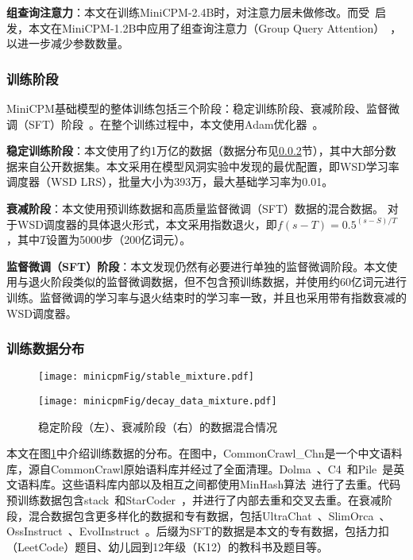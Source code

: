 \noindent\textbf{组查询注意力}：本文在训练MiniCPM-2.4B时，对注意力层未做修改。而受~\cite{liu2024mobilellm}启发，本文在MiniCPM-1.2B中应用了组查询注意力（Group Query Attention）~\citep{ainslie-etal-2023-gqa}，以进一步减少参数数量。

\subsubsection{训练阶段}
MiniCPM基础模型的整体训练包括三个阶段：稳定训练阶段、衰减阶段、监督微调（SFT）阶段~\citep{zhang2023instruction,wei2021finetuned}。在整个训练过程中，本文使用Adam优化器~\citep{kingma2014adam}。 

\textbf{稳定训练阶段}：本文使用了约1万亿的数据（数据分布见\ref{sec:appdatadistrbution}节），其中大部分数据来自公开数据集。本文采用在模型风洞实验中发现的最优配置，即WSD学习率调度器（WSD LRS），批量大小为393万，最大基础学习率为0.01。

\textbf{衰减阶段}：本文使用预训练数据和高质量监督微调（SFT）数据的混合数据。
对于WSD调度器的具体退火形式，本文采用指数退火，即$f(s-T)=  0.5^{(s-S)/T}$，其中$T$设置为5000步（200亿词元）。

\textbf{监督微调（SFT）阶段}：本文发现仍然有必要进行单独的监督微调阶段。本文使用与退火阶段类似的监督微调数据，但不包含预训练数据，并使用约60亿词元进行训练。监督微调的学习率与退火结束时的学习率一致，并且也采用带有指数衰减的WSD调度器。 


\subsubsection{训练数据分布}
\label{sec:appdatadistrbution}

\begin{figure}[htbp]
    \centering
    \begin{minipage}{0.48\linewidth}
        \centering
        \texttt{[image: minicpmFig/stable\_mixture.pdf]}
    \end{minipage}
    \hfill 
    \begin{minipage}{0.48\linewidth}
        \centering
        \texttt{[image: minicpmFig/decay\_data\_mixture.pdf]}
    \end{minipage}
    \caption{稳定阶段（左）、衰减阶段（右）的数据混合情况}
        \label{fig:appdatamixture}
\end{figure}

本文在图\ref{fig:appdatamixture}中介绍训练数据的分布。在图中，CommonCrawl\_Chn是一个中文语料库，源自CommonCrawl原始语料库并经过了全面清理。Dolma~\citep{dolma}、C4~\citep{2019t5}和Pile~\citep{gao2020pile, biderman2022datasheet}是英文语料库。这些语料库内部以及相互之间都使用MinHash算法~\citep{broder1997resemblance}进行了去重。代码预训练数据包含stack~\citep{Kocetkov2022TheStack}和StarCoder~\cite{li2023starcoder}，并进行了内部去重和交叉去重。在衰减阶段，混合数据包含更多样化的数据和专有数据，包括UltraChat~\citep{ding2023enhancing}、SlimOrca~\citep{SlimOrca, SlimOrcaDedup}、OssInstruct~\citep{wei2023magicoder}、EvolInstruct~\citep{xu2023wizardlm}。后缀为SFT的数据是本文的专有数据，包括力扣（LeetCode）题目、幼儿园到12年级（K12）的教科书及题目等。 


